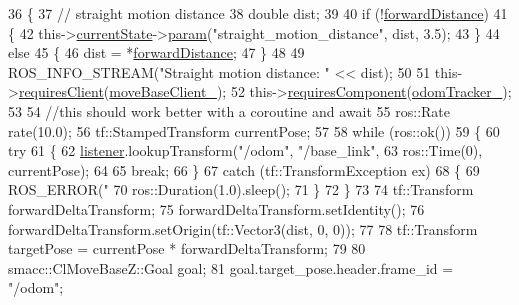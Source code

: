 \begin{DoxyCode}
36     \{
37         \textcolor{comment}{// straight motion distance}
38         \textcolor{keywordtype}{double} dist;
39 
40         \textcolor{keywordflow}{if} (!\hyperlink{classsm__dance__bot_1_1CbNavigateForward_a7aa9c05a79d2b0aa0f102ff06f579c07}{forwardDistance})
41         \{
42             this->\hyperlink{classsmacc_1_1SmaccClientBehavior_af76fc9b877542ed5caf033f820c107d0}{currentState}->\hyperlink{classsmacc_1_1ISmaccState_a4982f2187ed6da337462721146e8ef70}{param}(\textcolor{stringliteral}{"straight\_motion\_distance"}, dist, 3.5);
43         \}
44         \textcolor{keywordflow}{else}
45         \{
46             dist = *\hyperlink{classsm__dance__bot_1_1CbNavigateForward_a7aa9c05a79d2b0aa0f102ff06f579c07}{forwardDistance};
47         \}
48 
49         ROS\_INFO\_STREAM(\textcolor{stringliteral}{"Straight motion distance: "} << dist);
50 
51         this->\hyperlink{classsmacc_1_1SmaccClientBehavior_adc21bbd45d36bd81ca6f778ed161807a}{requiresClient}(\hyperlink{classsm__dance__bot_1_1CbNavigateForward_aa1cd872e92fca83c44ff0430bda061a7}{moveBaseClient\_});
52         this->\hyperlink{classsmacc_1_1SmaccClientBehavior_a011246bb1424f8bf8c9322f652db9d88}{requiresComponent}(\hyperlink{classsm__dance__bot_1_1CbNavigateForward_acaa4978c23fbc57fee5ee13a12842e7d}{odomTracker\_});
53 
54         \textcolor{comment}{//this should work better with a coroutine and await}
55         ros::Rate rate(10.0);
56         tf::StampedTransform currentPose;
57 
58         \textcolor{keywordflow}{while} (ros::ok())
59         \{
60             \textcolor{keywordflow}{try}
61             \{
62                 \hyperlink{classsm__dance__bot_1_1CbNavigateForward_a7bda457757f10a2e71eb15c07bf707b4}{listener}.lookupTransform(\textcolor{stringliteral}{"/odom"}, \textcolor{stringliteral}{"/base\_link"},
63                                          ros::Time(0), currentPose);
64 
65                 \textcolor{keywordflow}{break};
66             \}
67             \textcolor{keywordflow}{catch} (tf::TransformException ex)
68             \{
69                 ROS\_ERROR(\textcolor{stringliteral}{"%
70                 ros::Duration(1.0).sleep();
71             \}
72         \}
73 
74         tf::Transform forwardDeltaTransform;
75         forwardDeltaTransform.setIdentity();
76         forwardDeltaTransform.setOrigin(tf::Vector3(dist, 0, 0));
77 
78         tf::Transform targetPose = currentPose * forwardDeltaTransform;
79 
80         smacc::ClMoveBaseZ::Goal goal;
81         goal.target\_pose.header.frame\_id = \textcolor{stringliteral}{"/odom"};
}
\end{DoxyCode}
